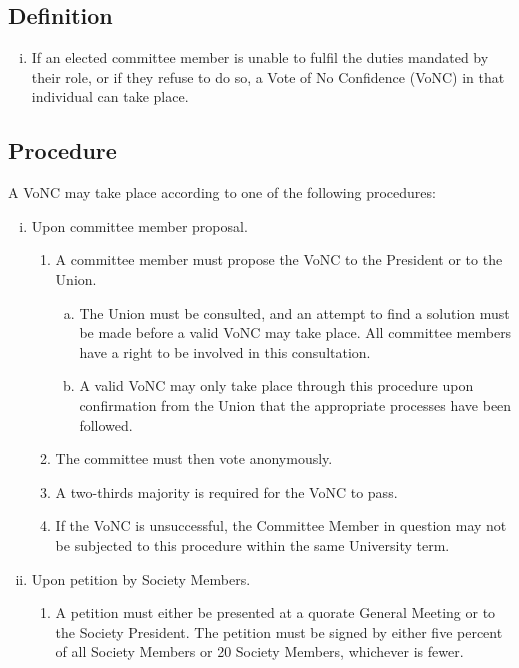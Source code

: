 \subsection{Definition}
\begin{enumerate}[i.]
    \item If an elected committee member is unable to fulfil the duties mandated by their role, or if they refuse to do so, a Vote of No Confidence (VoNC) in that individual can take place.
\end{enumerate}

\subsection{Procedure}
A VoNC may take place according to one of the following procedures:
\begin{enumerate}[i.]
    \item Upon committee member proposal.
    \begin{enumerate}[1.]
        \item A committee member must propose the VoNC to the President or to the Union.
        \begin{enumerate}[(a).]
            \item The Union must be consulted, and an attempt to find a solution must be made before a valid VoNC may take place. All committee members have a right to be involved in this consultation.
            \item A valid VoNC may only take place through this procedure upon confirmation from the Union that the appropriate processes have been followed.
        \end{enumerate}
        \item The committee must then vote anonymously.
        \item A two-thirds majority is required for the VoNC to pass.
        \item If the VoNC is unsuccessful, the Committee Member in question may not be subjected to this procedure within the same University term.
    \end{enumerate}
    \item Upon petition by Society Members.
    \begin{enumerate}[1.]
        \item A petition must either be presented at a quorate General Meeting or to the Society President. The petition must be signed by either five percent of all Society Members or 20 Society Members, whichever is fewer.

\end{enumerate}
\end{enumerate}
